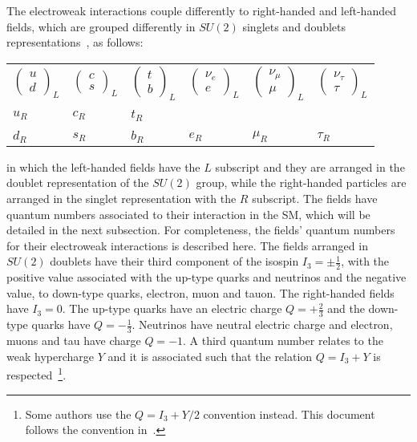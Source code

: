 The electroweak interactions couple differently to right-handed and left-handed fields, which are grouped differently in $SU(2)$ singlets and doublets
representations~\cite{qft}, as follows:

\begin{table}[H]
\centering
\begin{tabular}{ >{\centering\arraybackslash}m{2cm} >{\centering\arraybackslash}m{2cm} >{\centering\arraybackslash}m{2cm} >{\centering\arraybackslash}m{2cm} >{\centering\arraybackslash}m{2cm} >{\centering\arraybackslash}m{2cm}}
$\begin{pmatrix}  u \\ d \end{pmatrix}_L$ & $\begin{pmatrix} c \\ s \end{pmatrix}_L$ & $\begin{pmatrix} t \\ b \end{pmatrix}_L$ & $\begin{pmatrix} \nu_e \\ e \end{pmatrix}_L$ & $\begin{pmatrix} \nu_\mu \\ \mu \end{pmatrix}_L$ & $\begin{pmatrix} \nu_\tau \\ \tau \end{pmatrix}_L$ \\
&&&&&\\
$u_R$ & $c_R$ & $t_R$ & & &  \\
&&&&&\\
$d_R$ & $s_R$ & $b_R$ & $e_R$ & $\mu_R$ & $\tau_R$ \\
\end{tabular}
\label{eq:field_rep}
\end{table}
in which the left-handed fields have the $L$ subscript and they are arranged in the doublet representation of the $SU(2)$ group, while the right-handed
particles are arranged in the singlet representation with the $R$ subscript. The fields have quantum numbers associated to their interaction in the SM, which will
be detailed in the next subsection. For completeness, the fields' quantum numbers for their electroweak interactions is described here.
The fields arranged in $SU(2)$ doublets have their third component of the isospin $I_3 = \pm \frac{1}{2}$, with the positive value associated with the up-type quarks and
neutrinos and the negative value, to down-type quarks, electron, muon and tauon. The right-handed fields have $I_3 = 0$. The up-type quarks have an electric
charge $Q = + \frac{2}{3}$ and the down-type quarks have $Q = - \frac{1}{3}$. Neutrinos have neutral electric charge and electron, muons and tau have charge $Q = -1$.
A third quantum number relates to the weak hypercharge $Y$ and it is associated such that the relation $Q = I_3 + Y$ is respected~\footnote{Some authors use the $Q = I_3 + Y/2$
convention instead. This document follows the convention in~\cite{qft}.}.

